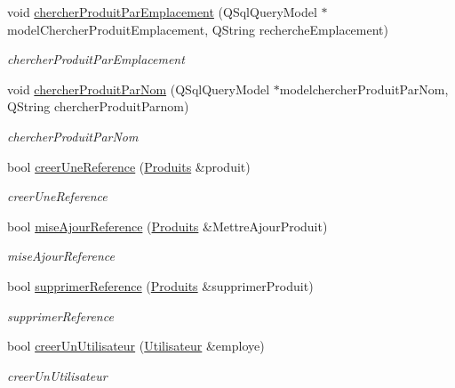 \begin{DoxyCompactItemize}
void \mbox{\hyperlink{class_base_de_donnees_a7741ad517714e619d7f8a0f202d3b38d}{chercher\+Produit\+Par\+Emplacement}} (Q\+Sql\+Query\+Model $\ast$model\+Chercher\+Produit\+Emplacement, Q\+String recherche\+Emplacement)
\begin{DoxyCompactList}\small\item\em chercher\+Produit\+Par\+Emplacement \end{DoxyCompactList}\item 
void \mbox{\hyperlink{class_base_de_donnees_a49d9a59025c2342adc820849bffb5532}{chercher\+Produit\+Par\+Nom}} (Q\+Sql\+Query\+Model $\ast$modelchercher\+Produit\+Par\+Nom, Q\+String chercher\+Produit\+Parnom)
\begin{DoxyCompactList}\small\item\em chercher\+Produit\+Par\+Nom \end{DoxyCompactList}\item 
bool \mbox{\hyperlink{class_base_de_donnees_a48345312e89c6e8fdeec128f033566ee}{creer\+Une\+Reference}} (\mbox{\hyperlink{class_produits}{Produits}} \&produit)
\begin{DoxyCompactList}\small\item\em creer\+Une\+Reference \end{DoxyCompactList}\item 
bool \mbox{\hyperlink{class_base_de_donnees_ae68726c99e17a89342655d8b842ced96}{mise\+Ajour\+Reference}} (\mbox{\hyperlink{class_produits}{Produits}} \&Mettre\+Ajour\+Produit)
\begin{DoxyCompactList}\small\item\em mise\+Ajour\+Reference \end{DoxyCompactList}\item 
bool \mbox{\hyperlink{class_base_de_donnees_a824bea64c3ef77eff0e4334a617b36c8}{supprimer\+Reference}} (\mbox{\hyperlink{class_produits}{Produits}} \&supprimer\+Produit)
\begin{DoxyCompactList}\small\item\em supprimer\+Reference \end{DoxyCompactList}\item 
bool \mbox{\hyperlink{class_base_de_donnees_acc7f10ab9b4699eaa495fa7829c0cfbd}{creer\+Un\+Utilisateur}} (\mbox{\hyperlink{class_utilisateur}{Utilisateur}} \&employe)
\begin{DoxyCompactList}\small\item\em creer\+Un\+Utilisateur \end{DoxyCompactList}\item 

\end{DoxyCompactItemize}

